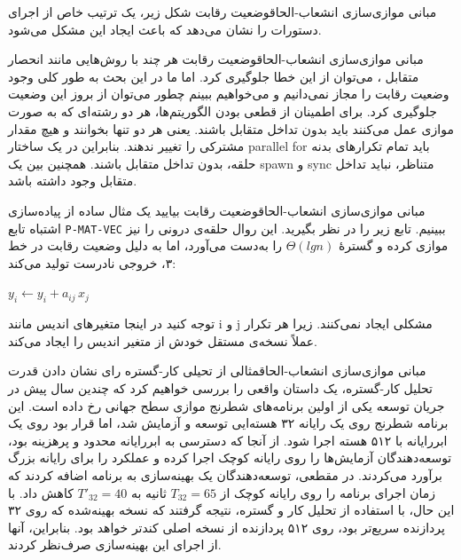 \begin{itemframe-s}{مبانی موازی‌سازی انشعاب-الحاق}{وضعیت رقابت}
\itm
شکل زیر، یک ترتیب خاص از اجرای دستورات را نشان می‌دهد که باعث ایجاد این مشکل می‌شود.
\end{itemframe-s}


\begin{itemframe-s}{مبانی موازی‌سازی انشعاب-الحاق}{وضعیت رقابت}
\itm
هر چند با روش‌هایی مانند انحصار متقابل
، می‌توان از این خطا جلوگیری کرد. اما ما در این بحث به طور کلی وجود وضعیت رقابت را مجاز نمی‌دانیم و می‌خواهیم ببینم چطور می‌توان از بروز این وضعیت جلوگیری کرد.
\itm
برای اطمینان از قطعی بودن الگوریتم‌ها، هر دو رشته‌ای که به صورت موازی عمل می‌کنند باید بدون تداخل متقابل
باشند. یعنی هر دو تنها بخوانند و هیچ مقدار مشترکی را تغییر ندهند.
\itm
بنابراین در یک ساختار parallel for باید تمام تکرارهای بدنه حلقه، بدون تداخل متقابل باشند. همچنین بین یک spawn و sync متناظر، نباید تداخل متقابل وجود داشته باشد.

\end{itemframe-s}


\begin{itemframe-s}{مبانی موازی‌سازی انشعاب-الحاق}{وضعیت رقابت}
\itm
بیایید یک مثال ساده از پیاده‌سازی اشتباه تابع
\texttt{P-MAT-VEC}
ببینیم.
تابع زیر را در نظر بگیرید. این روال حلقه‌ی درونی را نیز موازی کرده و گستره‌ٔ
$\Theta(lgn)$
را به‌دست می‌آورد، اما به دلیل وضعیت رقابت در خط ۳، خروجی نادرست تولید می‌کند:
\begin{algorithm}[H]\alglr
\caption{P-MAT-VEC-WRONG}
\begin{algorithmic}[1]
        \State $y_i \gets y_i + a_{ij} \, x_j$ 
    \EndpFor
\EndpFor
\end{algorithmic}
\end{algorithm}
\itm
توجه کنید در اینجا متغیرهای اندیس
مانند i و j مشکلی ایجاد نمی‌کنند. زیرا هر تکرار عملاً نسخه‌ی مستقل خودش از متغیر اندیس را ایجاد می‌کند.
\end{itemframe-s}


\begin{itemframe-s}{مبانی موازی‌سازی انشعاب-الحاق}{مثالی از تحیلی کار-گستره}
\itm
رای نشان دادن قدرت تحلیل کار-گستره، یک داستان واقعی را بررسی خواهیم کرد که چندین سال پیش در جریان توسعه یکی از اولین برنامه‌های شطرنج موازی سطح جهانی رخ داده است.
\itm
این برنامه شطرنج روی یک رایانه ۳۲ هسته‌ایی توسعه و آزمایش شد، اما قرار بود روی یک ابررایانه با ۵۱۲ هسته اجرا شود.
از آنجا که دسترسی به ابررایانه محدود و پرهزینه بود، توسعه‌دهندگان آزمایش‌ها را روی رایانه کوچک اجرا کرده و عملکرد را برای رایانه بزرگ برآورد می‌کردند.
\itm
در مقطعی، توسعه‌دهندگان یک بهینه‌سازی به برنامه اضافه کردند که زمان اجرای برنامه را روی رایانه کوچک از
$T_{32} = 65$
ثانیه به
$T'_{32} = 40$
کاهش داد. با این حال، با استفاده از تحلیل کار و گستره، نتیجه گرفتند که نسخه بهینه‌شده که روی ۳۲ پردازنده سریع‌تر بود، روی ۵۱۲ پردازنده از نسخه اصلی کندتر خواهد بود. بنابراین، آنها از اجرای این بهینه‌سازی صرف‌نظر کردند.
\end{itemframe-s}



